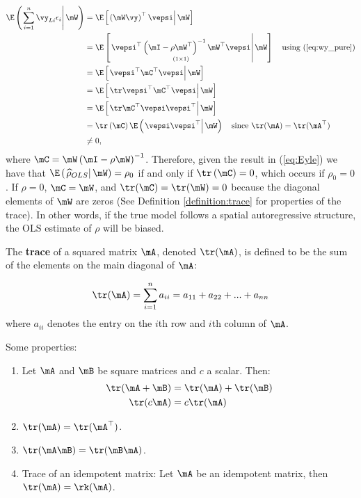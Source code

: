 \documentclass[english,12pt]{book}\usepackage[]{graphicx}\usepackage[]{xcolor}
\begin{document}
\begin{equation}\label{eq:Eyle}
  \begin{aligned}
      \E\left(\left.\sum_{i = 1}^{n}\vy_{Li}\epsilon_i \right| \mW\right) & =  \E\left[\left.\left(\mW\vy \right)^\top\vepsi\right| \mW\right] \\
      & =  \E\left[\left.\underset{(1\times 1)}{\vepsi^\top \left( \mI -\rho \mW^\top\right)^{-1}\mW^\top\vepsi} \right| \mW \right] \quad \mbox{using (\ref{eq:wy_pure})}\\
      & =  \E\left[\left.\vepsi^\top \mC^\top \vepsi \right| \mW\right] \\
      & = \E\left[\left.\tr \vepsi^\top  \mC^\top\vepsi\right|\mW \right] \\
      & = \E\left[\left.\tr \mC^\top \vepsi\vepsi^\top\right| \mW\right] \\
      & =  \tr \left(\mC\right) \E\left(\left.\vepsi\vepsi^\top\right| \mW\right)\quad \mbox{since $\tr(\mA) = \tr(\mA^\top)$} \\
      & \neq 0,
  \end{aligned}
\end{equation}
%
where $\mC = \mW\left( \mI -\rho \mW\right)^{-1}$. Therefore, given the result in (\ref{eq:Eyle}) we have that $\E\left(\left.\widehat{\rho}_{OLS}\right| \mW\right) = \rho_0$ if and only if $\tr \left(\mC\right) = 0$, which occurs if $\rho_0 = 0$. If $\rho = 0$, $\mC = \mW$, and $\tr(\mC) = \tr(\mW) = 0$ because the diagonal elements of $\mW$ are zeros (See Definition \ref{definition:trace} for properties of the trace).  In other words, if the true model follows a spatial autoregressive structure, the OLS estimate of $\rho$ will be biased. 

\begin{definition}\label{definition:trace}
  The \textbf{trace} of a squared matrix $\mA$, denoted $\tr(\mA)$, is defined to be the sum of the elements on the main diagonal of $\mA$:
  
  \begin{equation}
    \tr(\mA) = \sum_{i = 1}^n a_{ii} = a_{11} + a_{22} + ... + a_{nn}
  \end{equation}
  where $a_{ii}$ denotes the entry on the $i$th row and $i$th column of $\mA$. 
  
 Some properties:
 \begin{enumerate}
  \item Let $\mA$ and $\mB$ be square matrices and $c$ a scalar. Then:
  \begin{align}
    \tr(\mA + \mB) & = \tr(\mA) + \tr(\mB) \\
    \tr(c\mA) & = c\tr(\mA)
  \end{align}
  \item $\tr(\mA) = \tr(\mA^{\top})$. 
  \item $\tr(\mA\mB) = \tr(\mB\mA)$.
  \item Trace of an idempotent matrix: Let $\mA$ be an idempotent matrix, then $\tr(\mA)= \rk(\mA)$. 
 \end{enumerate}
\end{definition}
\end{document}
